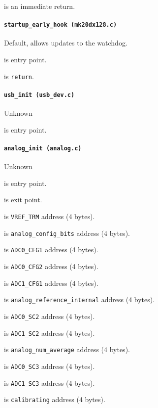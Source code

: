  is an immediate return.

\paragraph{\texttt{startup\_early\_hook (mk20dx128.c)}} Default, allows updates
to the watchdog.

 is entry point.

 is \texttt{return}.

\paragraph{\texttt{usb\_init (usb\_dev.c)}} Unknown

 is entry point.

\paragraph{\texttt{analog\_init (analog.c)}} Unknown

 is entry point.

 is exit point.

 is \texttt{VREF\_TRM} address (4 bytes).

 is \texttt{analog\_config\_bits} address (4 bytes).

 is \texttt{ADC0\_CFG1} address (4 bytes).

 is \texttt{ADC0\_CFG2} address (4 bytes).

 is \texttt{ADC1\_CFG1} address (4 bytes).

 is \texttt{analog\_reference\_internal} address
(4 bytes).

 is \texttt{ADC0\_SC2} address (4 bytes).

 is \texttt{ADC1\_SC2} address (4 bytes).

 is \texttt{analog\_num\_average} address (4 bytes).

 is \texttt{ADC0\_SC3} address (4 bytes).

 is \texttt{ADC1\_SC3} address (4 bytes).

 is \texttt{calibrating} address (4 bytes).


